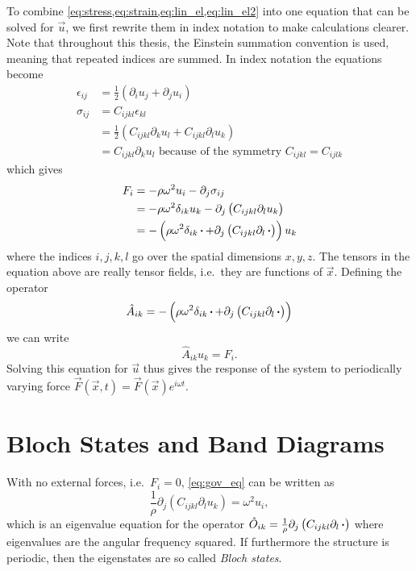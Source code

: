 To combine \cref{eq:stress,eq:strain,eq:lin_el,eq:lin_el2} into one equation
that can be solved for $\vec{u}$, we first
rewrite them in index notation to make calculations clearer.
Note that throughout this thesis, the Einstein summation convention is used,
meaning that repeated indices are summed. %
In index notation the equations become
\begin{align}
	\epsilon_{ij} &= \frac12(\partial_i u_j + \partial_j u_i)\\
	\label{eq:double_scalar_product_index_not}
	\sigma_{ij} &= C_{ijkl} \epsilon_{kl}\\
				&= \frac12\left(C_{ijkl} \partial_k u_l + C_{ijkl} \partial_l
				u_k\right)\\
				&= C_{ijkl} \partial_k u_l\text{ because of the symmetry $C_{ijkl}=C_{ijlk}$}
\end{align}
which gives
\begin{align}
	F_{i} &= -\rho \omega^2 u_{i} - \partial_j \sigma_{ij}\\
		   &= -\rho \omega^2 \delta_{ik} u_{k} -
		   \partial_j \left(C_{ijkl} \partial_l u_k\right)\\
		   &= -\left(\rho \omega^2 \delta_{ik} \operatorname{\boldsymbol{\cdot}} + 
		   \partial_j \left(C_{ijkl} \partial_l \operatorname{\boldsymbol{\cdot}}\right)\right) u_k
\end{align}
where the indices $i,j,k,l$ go over the spatial dimensions $x,y,z$.
The tensors in the equation above are really tensor fields, i.e.\ they are
functions of $\vec{x}$.
Defining the operator
\begin{equation}\label{eq:A_def}
	\hat A_{ik} =
	-\left(\rho \omega^2 \delta_{ik} \operatorname{\boldsymbol{\cdot}} +
	\partial_j \left(C_{ijkl} \partial_l \operatorname{\boldsymbol{\cdot}}\right)\right)
\end{equation}
we can write
\begin{equation}\label{eq:gov_eq}
	\hat A_{ik} u_k = F_i.
\end{equation}
Solving this equation for $\vec u$ thus gives the response of the system to
periodically varying force $\vec F(\vec x, t) = \vec F(\vec x) e^{i\omega t}$.

\section{Bloch States and Band Diagrams}\label{sec:bloch}

With no external forces, i.e.\ $F_i = 0$, \cref{eq:gov_eq} can be written as
\begin{equation}
	\frac 1 \rho \partial_j \left(C_{ijkl} \partial_l u_k\right) = \omega^2 u_i,
\end{equation}
which is an eigenvalue equation for the operator
$\hat O_{ik} = \frac 1 \rho\partial_j \left(C_{ijkl} \partial_l \operatorname{\boldsymbol{\cdot}}\right)$
where eigenvalues are the angular frequency squared.
If furthermore the structure is periodic, then the eigenstates are so called
\emph{Bloch states}.

